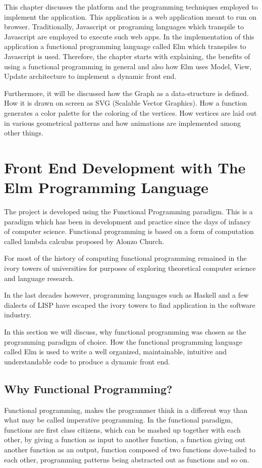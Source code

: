 
This chapter discusses the platform and the programming techniques employed to
implement the application.  This application is a web application meant to run
on browser. Traditionally, Javascript or programing languages which transpile
to Javascript are employed to execute such web apps. In the implementation of
this application a functional programming language called Elm which transpiles
to Javascript is used. Therefore, the chapter starts with explaining, the benefits
of using a functional programming in general and also how Elm uses Model, View, Update
architecture to implement a dynamic front end.

Furthermore, it will be discussed how the Graph as a data-structure is defined. How
it is drawn on screen as SVG (Scalable Vector Graphics). How a function
generates a color palette for the coloring of the vertices. How vertices are
laid out in various geometrical patterns and how animations are implemented
among other things.


\section{Front End Development with The Elm Programming Language}

The project is developed using the Functional Programming paradigm. This is a
paradigm which has been in development and practice since the days of infancy of
computer science. Functional programming is based on a form of computation
called lambda calculus proposed by Alonzo Church.

For most of the history of computing functional programming remained in the
ivory towers of universities for purposes of exploring theoretical computer
science and language research.

In the last decades however, programming languages such as Haskell and a few
dialects of LISP have escaped the ivory towers to find application in the
software industry.

In this section we will discuss, why functional programming was chosen as the
programming paradigm of choice. How the functional programming language called
Elm is used to write a well organized, maintainable, intuitive and
understandable code to produce a dynamic front end.

\subsection{Why Functional Programming?}
Functional programming, makes the programmer think in a different way than what
may be called imperative programming. In the functional paradigm, functions are
first class citizens, which can be mashed up together with each other, by
giving a function as input to another function, a function giving out another
function as an output, function composed of two functions dove-tailed to each
other, programming patterns being abstracted out as functions and so on.

